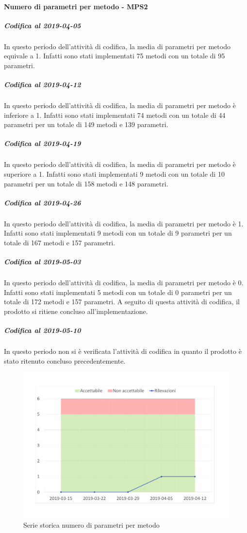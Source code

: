 \paragraph{Numero di parametri per metodo - MPS2}
\subparagraph{Codifica al 2019-04-05}
In questo periodo dell'attività di codifica, la media di parametri per metodo equivale a 1. Infatti sono stati implementati 75 metodi con un totale di 95 parametri.

\subparagraph{Codifica al 2019-04-12}
In questo periodo dell'attività di codifica, la media di parametri per metodo è inferiore a 1. Infatti sono stati implementati 74 metodi con un totale di 44 parametri per un totale di 149 metodi e 139 parametri.

\subparagraph{Codifica al 2019-04-19}
In questo periodo dell'attività di codifica, la media di parametri per metodo è superiore a 1. Infatti sono stati implementati 9 metodi con un totale di 10 parametri per un totale di 158 metodi e 148 parametri.

\subparagraph{Codifica al 2019-04-26}
In questo periodo dell'attività di codifica, la media di parametri per metodo è 1. Infatti sono stati implementati 9 metodi con un totale di 9 parametri per un totale di 167 metodi e 157 parametri.

\subparagraph{Codifica al 2019-05-03}
In questo periodo dell'attività di codifica, la media di parametri per metodo è 0. Infatti sono stati implementati 5 metodi con un totale di 0 parametri per un totale di 172 metodi e 157 parametri. 
A seguito di questa attività di codifica, il prodotto si ritiene concluso all'implementazione.

\subparagraph{Codifica al 2019-05-10}
In questo periodo non si è verificata l'attività di codifica in quanto il prodotto è stato ritenuto concluso precedentemente.
\\
\begin{figure}[H]
	\centering
	\includegraphics[scale=0.6]{images/resoconto/MPS2Chart.pdf}
	\caption{Serie storica numero di parametri per metodo}	
\end{figure}

